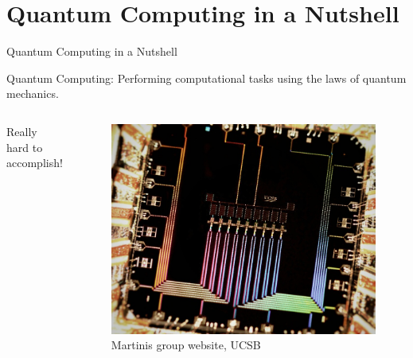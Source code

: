 \section{Quantum Computing in a Nutshell}

\begin{frame}{Quantum Computing in a Nutshell}

\begin{block}{Quantum Computing:}
 Performing computational tasks using the laws of quantum mechanics.
\end{block}

 \begin{columns}
  
  \vspace{\floatsep}
  
  \alert{Really hard to accomplish!}
  
    \begin{figure}
     \centering
     \includegraphics[width=\linewidth]{gfx/Linear9XmonSurfaceCode}
     \caption{\footnotesize Martinis group website, UCSB}
    \end{figure}

 \end{columns}


\end{frame}

